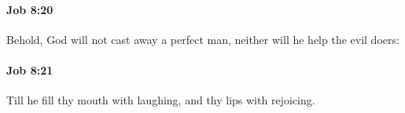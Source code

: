 		\paragraph{Job 8:20} %
			\label{JOB-8-20}

			Behold, God will not cast away a perfect man, neither will he help the evil doers:


		\paragraph{Job 8:21} %
			\label{JOB-8-21}

			Till he fill thy mouth with laughing, and thy lips with rejoicing.


